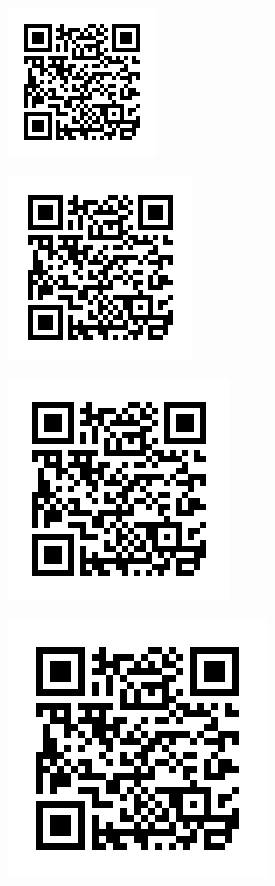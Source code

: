 \documentclass[a4]{article}
\begin{document}
	
\begin{figure} 
	\includegraphics{308_box_size_4_} 
	\label{fig:null_data_frame_psdos}
\end{figure}

	
\begin{figure} 
	\includegraphics{308_box_size_5_} 
	\label{fig:null_data_frame_psdos}
\end{figure}

	
\begin{figure} 
	\includegraphics{308_box_size_6_} 
	\label{fig:null_data_frame_psdos}
\end{figure}

	
\begin{figure} 
	\includegraphics{308_box_size_7_} 
	\label{fig:null_data_frame_psdos}
\end{figure}
\end{document}
